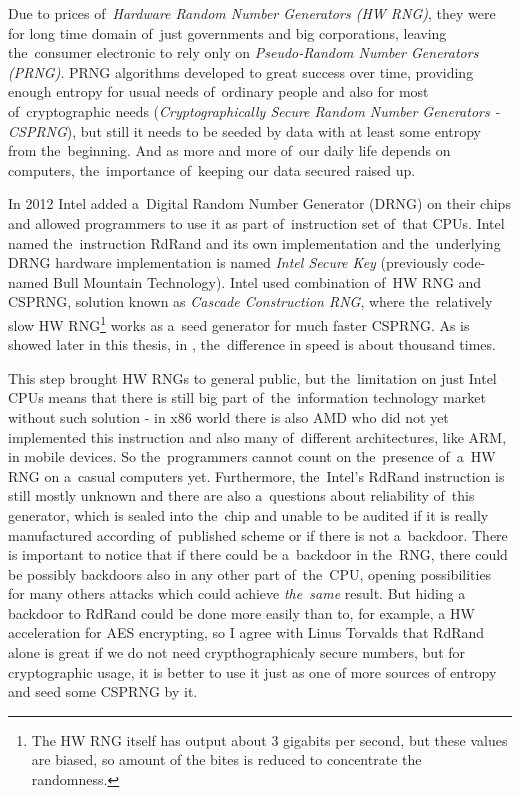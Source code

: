 Due to prices of~{\em Hardware Random Number Generators (HW RNG)}, they were for long time domain of~just governments and big corporations,%
leaving the~consumer electronic to rely only on {\em Pseudo-Random Number Generators (PRNG)}. PRNG algorithms developed to great success over time, providing enough entropy for usual needs of~ordinary people and also for most of~cryptographic needs ({\em Cryptographically Secure Random Number Generators - CSPRNG}), but still it needs to be seeded by data with at least some entropy from the~beginning. And as more and more of~our daily life depends on computers, the~importance of~keeping our data secured raised up. 

In 2012\cite{IntelRdRandFindAbout} Intel added a~Digital Random Number Generator (DRNG) on their chips and allowed programmers to use it as part of~instruction set of~that CPUs. Intel named the~instruction RdRand and its own implementation and the~underlying DRNG hardware implementation is named {\em Intel Secure Key} (previously code-named Bull Mountain Technology)\cite{IntelDRNGAnalysis}. Intel used combination of~HW RNG and CSPRNG, solution known as {\em Cascade Construction RNG}, where the~relatively slow HW RNG\footnote{The HW RNG itself has output about 3 gigabits per second\cite{BehindRdRand}, but these values are biased, so amount of the bites is reduced to concentrate the randomness.} works as a~seed generator for much faster CSPRNG. As is showed later in this thesis, in , the~difference in speed is about thousand times.

This step brought HW RNGs to general public, but the~limitation on just Intel CPUs means that there is still big part of~the~information technology market without such solution - in x86 world there is also AMD who did not yet implemented this instruction and also many of~different architectures, like ARM, in mobile devices. So the~programmers cannot count on the~presence of~a~HW RNG on a~casual computers yet. Furthermore, the~Intel's RdRand instruction is still mostly unknown and there are also a~questions about reliability of~this generator, which is sealed into the~chip and unable to be audited\cite{TheodoreTsoNSA} if it is really manufactured according of~published scheme\cite{AnalysisOfDRNG} or if there is not a~backdoor. There is important to notice that if there could be a~backdoor in the~RNG, there could be possibly backdoors also in any other part of~the~CPU, opening possibilities for many others attacks which could achieve {\em the~same} result. But hiding a backdoor to RdRand could be done more easily than to, for example, a HW acceleration for AES encrypting, so I agree with Linus Torvalds that RdRand alone is great if we do not need crypthographicaly secure numbers, but for cryptographic usage, it is better to use it just as one of more sources of entropy and seed some CSPRNG by it.

